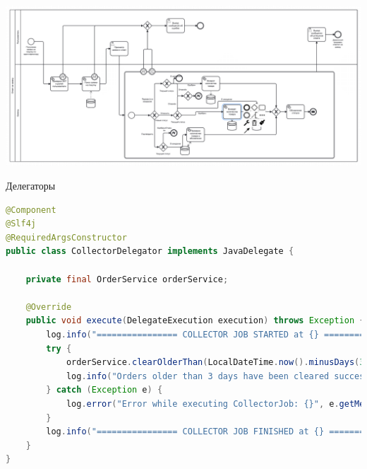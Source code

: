 \documentclass{article}
\begin{document}
\begin{center}
    \includegraphics[width=.9\textwidth]{3.png}
\end{center}

Делегаторы
\begin{lstlisting}[language=Java]
@Component
@Slf4j
@RequiredArgsConstructor
public class CollectorDelegator implements JavaDelegate {

    private final OrderService orderService;

    @Override
    public void execute(DelegateExecution execution) throws Exception {
        log.info("================ COLLECTOR JOB STARTED at {} ================", LocalDateTime.now());
        try {
            orderService.clearOlderThan(LocalDateTime.now().minusDays(3));
            log.info("Orders older than 3 days have been cleared successfully");
        } catch (Exception e) {
            log.error("Error while executing CollectorJob: {}", e.getMessage(), e);
        }
        log.info("================ COLLECTOR JOB FINISHED at {} ================", LocalDateTime.now());
    }
}
\end{lstlisting}
\end{document}
